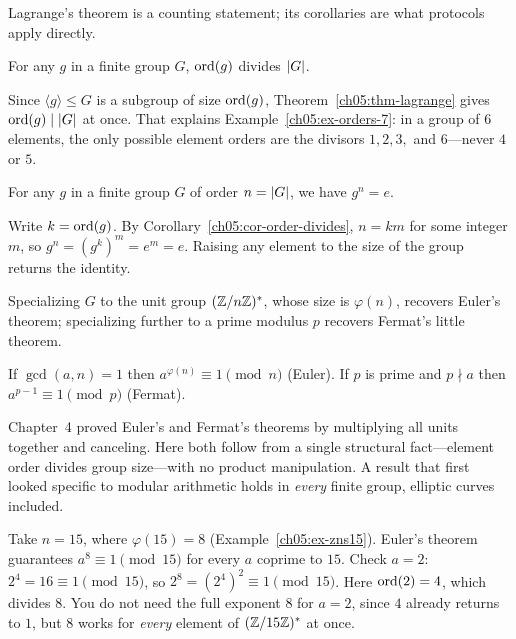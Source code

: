 Lagrange's theorem is a counting statement; its corollaries are what protocols apply directly.

\begin{corollary}
\label{ch05:cor-order-divides}
For any $g$ in a finite group $G$, $\operatorname{ord}(g)$ divides $\lvert G\rvert$.
\end{corollary}
Since $\langle g\rangle \le G$ is a subgroup of size $\operatorname{ord}(g)$, Theorem~\ref{ch05:thm-lagrange} gives $\operatorname{ord}(g) \mid \lvert G\rvert$ at once. That explains Example~\ref{ch05:ex-orders-7}: in a group of
$6$ elements, the only possible element orders are the divisors $1, 2, 3,$ and $6$---never $4$ or $5$.

\begin{corollary}
\label{ch05:cor-glag}
For any $g$ in a finite group $G$ of order $n=\lvert G\rvert$, we have $g^{n} = e$.
\end{corollary}
Write $k = \operatorname{ord}(g)$. By Corollary~\ref{ch05:cor-order-divides}, $n = k m$ for some integer $m$, so
$g^{n} = (g^{k})^{m} = e^{m} = e$. Raising any element to the size of the group returns the identity.

Specializing $G$ to the unit group $(\mathbb{Z}/n\mathbb{Z})^{*}$, whose size is
$\varphi(n)$, recovers Euler's theorem; specializing
further to a prime modulus $p$ recovers Fermat's little theorem.

\begin{corollary}
\label{ch05:cor-euler-fermat}
If $\gcd(a,n)=1$ then $a^{\varphi(n)} \equiv 1 \pmod n$ \textup{(Euler)}. If $p$ is prime
and $p \nmid a$ then $a^{p-1} \equiv 1 \pmod p$ \textup{(Fermat)}.
\end{corollary}

\begin{intuitionbox}
Chapter~4 proved Euler's and Fermat's theorems by multiplying all units together and canceling. Here both follow from a single structural fact---element order divides group size---with no product manipulation. A result that first looked specific to modular arithmetic holds in \emph{every} finite group, elliptic curves included.
\end{intuitionbox}

\begin{example}
\label{ch05:ex-euler}
Take $n=15$, where $\varphi(15)=8$ (Example~\ref{ch05:ex-zns15}). Euler's theorem guarantees
$a^{8}\equiv 1 \pmod{15}$ for every $a$ coprime to $15$. Check $a=2$: $2^4 = 16 \equiv 1 \pmod{15}$, so
$2^8 = (2^4)^2 \equiv 1 \pmod{15}$. Here $\operatorname{ord}(2)=4$, which divides $8$. You
do not need the full exponent $8$ for $a=2$, since $4$ already returns to $1$, but $8$
works for \emph{every} element of $(\mathbb{Z}/15\mathbb{Z})^{*}$ at once.
\end{example}

